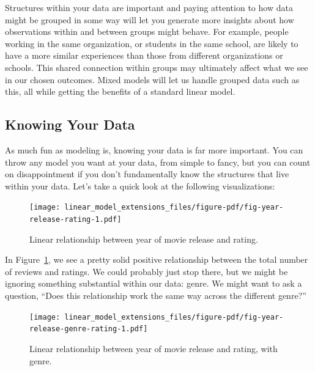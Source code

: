 \documentclass[
  letterpaper,
]{krantz}
\begin{document}
Structures within your data are important and paying attention to how
data might be grouped in some way will let you generate more insights
about how observations within and between groups might behave. For
example, people working in the same organization, or students in the
same school, are likely to have a more similar experiences than those
from different organizations or schools. This shared connection within
groups may ultimately affect what we see in our chosen outcomes. Mixed
models will let us handle grouped data such as this, all while getting
the benefits of a standard linear model.

\subsection{Knowing Your Data}\label{sec-mixed-models-knowing}

As much fun as modeling is, knowing your data is far more important. You
can throw any model you want at your data, from simple to fancy, but you
can count on disappointment if you don't fundamentally know the
structures that live within your data. Let's take a quick look at the
following visualizations:

\begin{figure}

{\centering \texttt{[image: linear\_model\_extensions\_files/figure-pdf/fig-year-release-rating-1.pdf]}

}

\caption{\label{fig-year-release-rating}Linear relationship between year
of movie release and rating.}

\end{figure}

In Figure~\ref{fig-year-release-rating}, we see a pretty solid positive
relationship between the total number of reviews and ratings. We could
probably just stop there, but we might be ignoring something substantial
within our data: genre. We might want to ask a question, ``Does this
relationship work the same way across the different genre?''

\begin{figure}

{\centering \texttt{[image: linear\_model\_extensions\_files/figure-pdf/fig-year-release-genre-rating-1.pdf]}

}

\caption{\label{fig-year-release-genre-rating}Linear relationship
between year of movie release and rating, with genre.}

\end{figure}
\end{document}
